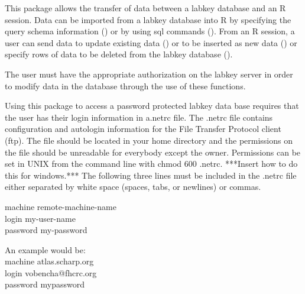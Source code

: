 \begin{Description}\relax
This package allows the transfer of data between a labkey database and an R session. Data can be imported from 
a labkey database into R by specifying the query schema information () 
or by using sql commands (). From an R session,
a user can send data to update existing data () or to be inserted as new data 
() or specify rows of data to be deleted from the labkey database (). 

The user must have the appropriate authorization on the labkey
server in order to modify data in the database through the use of
these functions.
\end{Description}
\begin{Details}\relax
{}
Using this package to access a password protected labkey data base requires that the user
has their login information in a.netrc file. The .netrc file
contains configuration and autologin information for the File Transfer Protocol client (ftp).
The file should be located in your home directory and the permissions on the file should be unreadable for 
everybody except the owner. Permissions can be set in UNIX from the command line with chmod 600 .netrc.  
***Insert how to do this for windows.***
The following three lines must be included in the .netrc file either separated by white space
(spaces, tabs, or newlines) or commas.

machine remote-machine-name\\
login my-user-name\\
password my-password


An example would be:\\
machine atlas.scharp.org\\
login vobencha@fhcrc.org\\
password mypassword\\
\end{Details}
